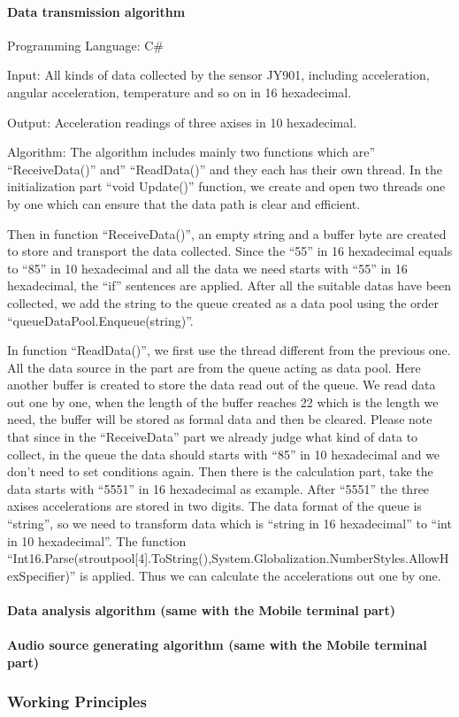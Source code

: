\paragraph{Data transmission algorithm}

Programming Language: C\#

Input: All kinds of data collected by the sensor JY901, including acceleration,
angular acceleration, temperature and so on in 16 hexadecimal.   

 Output: Acceleration readings of three axises in 10 hexadecimal. 

 Algorithm: The algorithm includes mainly two functions which are''
 ``ReceiveData()'' and'' ``ReadData()'' and they each has their own thread. In
 the initialization part “void Update()” function, we create and open two
 threads one by one which can ensure that the data path is clear and efficient.

 Then in function ``ReceiveData()'', an empty string and a buffer byte are
 created to store and transport the data collected. Since the “55” in 16
 hexadecimal equals to “85” in 10 hexadecimal and all the data we need starts
 with “55” in 16 hexadecimal, the “if” sentences are applied. After all the
 suitable datas have been collected, we add the string to the queue created as a
 data pool using the order “queueDataPool.Enqueue(string)”. 

 In function ``ReadData()'', we first use the thread different from the previous
 one. All the data source in the part are from the queue acting as data pool.
 Here another buffer is created to store the data read out of the queue. We read
 data out one by one, when the length of the buffer reaches 22 which is the
 length we need, the buffer will be stored as formal data and then be cleared.
 Please note that since in the “ReceiveData” part we already judge what kind of
 data to collect, in the queue the data should starts with “85” in 10
 hexadecimal and we don’t need to set conditions again. Then there is the
 calculation part, take the data starts with “5551” in 16 hexadecimal as
 example. After “5551” the three axises accelerations are stored in two digits.
 The data format of the queue is “string”, so we need to transform data which is
 “string in 16 hexadecimal” to “int in 10 hexadecimal”. The function
 “Int16.Parse(stroutpool[4].ToString(),System.Globalization.NumberStyles.AllowHexSpecifier)” 
 is applied. Thus we can calculate the accelerations out one by one.  
\paragraph{Data analysis algorithm (same with the Mobile terminal part)}
\paragraph{Audio source generating algorithm (same with the Mobile terminal
  part)} 
\subsubsection{Working Principles}